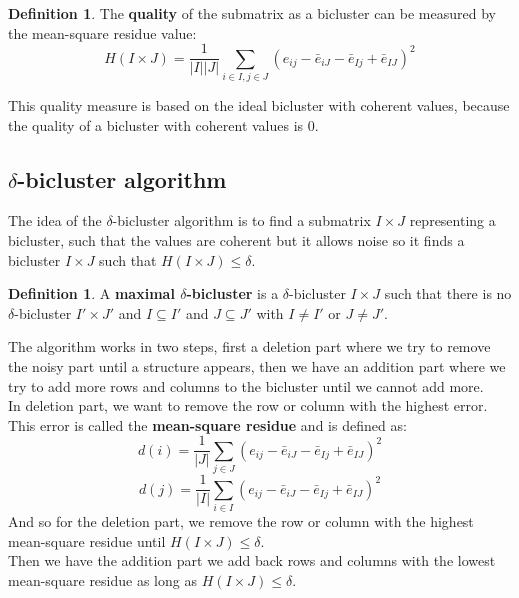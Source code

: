 \documentclass[12pt, openany]{report}
\theoremstyle{definition}
\newtheorem{definition}[thm]{Definition}
\begin{document}
\begin{definition}
    The \textbf{quality} of the submatrix as a bicluster can be measured by the mean-square residue value:
    \begin{equation}
        H(I \times J) = \frac{1}{|I||J|} \sum_{i\in I, j \in J} (e_{ij} - \bar{e}_{iJ} - \bar{e}_{Ij} + \bar{e}_{IJ})^2
    \end{equation}
\end{definition}
This quality measure is based on the ideal bicluster with coherent values, because the quality of a bicluster with coherent values is 0. 
\subsection{$\delta$-bicluster algorithm}
The idea of the $\delta$-bicluster algorithm is to find a submatrix $I \times J$ representing a bicluster, such that the values are coherent but it allows noise so it finds a bicluster $I \times J$ such that $H(I \times J) \leq \delta$.\\
\begin{definition}
    A \textbf{maximal $\delta$-bicluster} is a $\delta$-bicluster $I \times J$ such that there is no $\delta$-bicluster $I' \times J'$ and $I \subseteq I'$ and $J \subseteq J'$ with $I \neq I'$ or $J \neq J'$. 
\end{definition}
The algorithm works in two steps, first a deletion part where we try to remove the noisy part until a structure appears, then we have an addition part where we try to add more rows and columns to the bicluster until we cannot add more.\\
In deletion part, we want to remove the row or column with the highest error. This error is called the \textbf{mean-square residue} and is defined as:
\begin{equation}
    d(i) = \frac{1}{|J|} \sum_{j \in J} (e_{ij} - \bar{e}_{iJ} - \bar{e}_{Ij} + \bar{e}_{IJ})^2
\end{equation}
\begin{equation}
    d(j) = \frac{1}{|I|} \sum_{i \in I} (e_{ij} - \bar{e}_{iJ} - \bar{e}_{Ij} + \bar{e}_{IJ})^2
\end{equation}
And so for the deletion part, we remove the row or column with the highest mean-square residue until $H(I \times J) \leq \delta$.\\
Then we have the addition part we add back rows and columns with the lowest mean-square residue as long as $H(I \times J) \leq \delta$.
\end{document}

